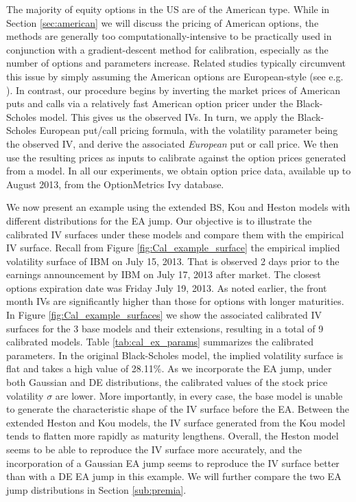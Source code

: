 \documentclass[11pt]{article}
\numberwithin{equation}{section}
\numberwithin{theorem}{section}
\begin{document}
The majority of equity options in the US are of
the American type.  While in Section \ref{sec:american} we will discuss  the pricing of   American options, the methods are generally  too computationally-intensive to be practically used in conjunction
with a gradient-descent method for calibration, especially as the number of options and parameters increase. Related studies typically circumvent this issue by simply assuming the American options are European-style (see e.g. \cite{Dubinsky2006, Broadie2009}). In contrast, our procedure  begins by inverting the market prices of American puts and calls via   a relatively fast American option pricer under the Black-Scholes model.  This gives us the observed IVs. In turn,  we apply the   Black-Scholes European put/call pricing formula,  with the volatility parameter being the  observed IV, and derive the associated  \textit{European} put or call  price. We then use the resulting prices as  inputs to calibrate against the option prices generated from a model.  In all our experiments, we obtain option price data, available up to August 2013,  from the OptionMetrics Ivy database.


We now present an   example using  the extended BS, Kou and Heston models with  different  distributions for the EA jump. Our objective is to illustrate the  calibrated  IV surfaces under these models and compare them with the empirical IV surface.    Recall from Figure \ref{fig:Cal_example_surface} the empirical  implied volatility surface of IBM on July 15, 2013. That is observed   2 days prior to the earnings announcement by IBM on  July  17, 2013 after market. The closest options expiration date  was
Friday  July 19, 2013.  As noted earlier,   the front month IVs are significantly higher than those for options with longer maturities. In Figure \ref{fig:Cal_example_surfaces}
we show the associated calibrated IV surfaces for the 3  base models and their extensions, resulting in  a total of 9  calibrated models.   Table
\ref{tab:cal_ex_params}  summarizes  the calibrated parameters.  In the original Black-Scholes model, the implied volatility surface is flat and takes a high value of 28.11\%. As we incorporate the EA jump, under both Gaussian and DE distributions, the calibrated  values  of the stock price volatility $\sigma$ are lower.  More importantly, in every case, the base model is unable to generate the characteristic shape of the IV surface before the EA.  Between the extended Heston and Kou models, the  IV surface generated from the Kou model tends to flatten more rapidly as maturity lengthens. Overall,  the Heston model seems to be  able to reproduce the IV surface more accurately, and the incorporation of  a Gaussian EA jump seems to reproduce the IV surface better than with a DE EA jump in this example. We will further compare the two EA jump distributions in Section \ref{sub:premia}.
\end{document}

